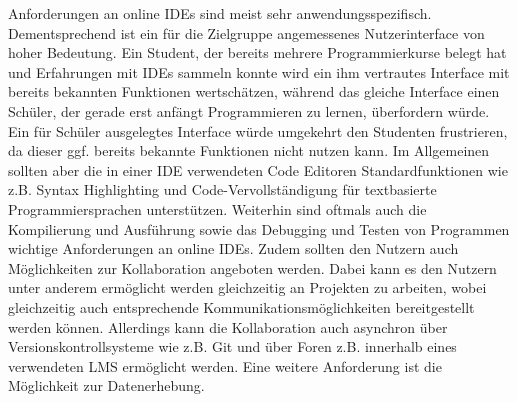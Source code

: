 
Anforderungen an online IDEs sind meist sehr anwendungsspezifisch. Dementsprechend ist ein für die Zielgruppe angemessenes Nutzerinterface von hoher Bedeutung. Ein Student, der bereits mehrere Programmierkurse belegt hat und Erfahrungen mit IDEs sammeln konnte wird ein ihm vertrautes Interface mit bereits bekannten Funktionen wertschätzen, während das gleiche Interface einen Schüler, der gerade erst anfängt Programmieren zu lernen, überfordern würde. Ein für Schüler ausgelegtes Interface würde umgekehrt den Studenten frustrieren, da dieser ggf. bereits bekannte Funktionen nicht nutzen kann. Im Allgemeinen sollten aber die in einer IDE verwendeten Code Editoren Standardfunktionen wie z.B. Syntax Highlighting und Code-Vervollständigung für textbasierte Programmiersprachen unterstützen. Weiterhin sind oftmals auch die Kompilierung und Ausführung sowie das Debugging und Testen von Programmen wichtige Anforderungen an online IDEs. Zudem sollten den Nutzern auch Möglichkeiten zur Kollaboration angeboten werden. Dabei kann es den Nutzern unter anderem ermöglicht werden gleichzeitig an Projekten zu arbeiten, wobei gleichzeitig auch entsprechende Kommunikationsmöglichkeiten bereitgestellt werden können. Allerdings kann die Kollaboration auch asynchron über Versionskontrollsysteme wie z.B. Git  und über Foren z.B. innerhalb eines verwendeten LMS ermöglicht werden. Eine weitere Anforderung ist die Möglichkeit zur Datenerhebung.

